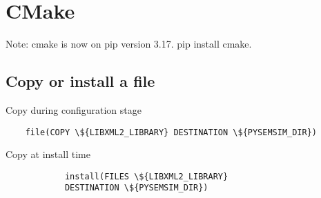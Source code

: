 \documentclass[../LabBook]{subfiles}
\begin{document}
    \section{CMake}

    Note: cmake is now on pip version 3.17. pip install cmake.

    \subsection{Copy or install a file}

    Copy during configuration stage
    \begin{verbatim}
    file(COPY \${LIBXML2_LIBRARY} DESTINATION \${PYSEMSIM_DIR})
    \end{verbatim}

    Copy at install time
    \begin{verbatim}
            install(FILES \${LIBXML2_LIBRARY}
            DESTINATION \${PYSEMSIM_DIR})
    \end{verbatim}
\end{document}
